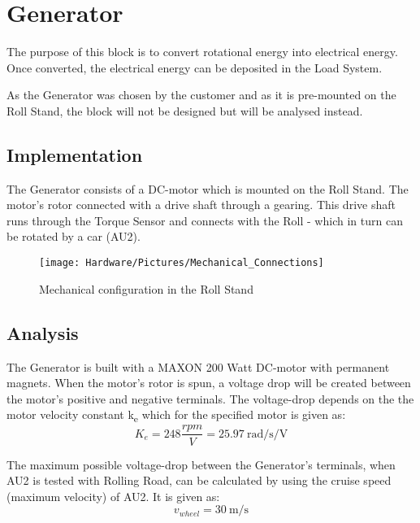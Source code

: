 \newpage
\section{Generator}
The purpose of this block is to convert rotational energy into electrical energy. Once converted, the electrical energy can be deposited in the Load System.

As the Generator was chosen by the customer and as it is pre-mounted on the Roll Stand, the block will not be designed but will be analysed instead.

\subsection{Implementation}
The Generator consists of a DC-motor which is mounted on the Roll Stand. The motor's rotor connected with a drive shaft through a gearing. This drive shaft runs through the Torque Sensor and connects with the Roll - which in turn can be rotated by a car (AU2).

\begin{figure}[H]
	\centering
	\texttt{[image: Hardware/Pictures/Mechanical\_Connections]}
	\caption{Mechanical configuration in the Roll Stand}
	\label{fig:Generator_Implementation}
\end{figure}

\subsection{Analysis}
\label{sec:GeneratorAnalysis}
The Generator is built with a MAXON 200 Watt DC-motor with permanent magnets\cite{Maxon}. When the motor's rotor is spun, a voltage drop will be created between the motor's positive and negative terminals. The voltage-drop depends on the the motor velocity constant k\textsubscript{e} which for the specified motor is given as:
\begin{equation}
	K_e = 248 \frac{rpm}{V} = \SI[per-mode=fraction]{25.97}{\radian \per \second \per \volt}
\end{equation}

The maximum possible voltage-drop between the Generator's terminals, when AU2 is tested with Rolling Road, can be calculated by using the cruise speed (maximum velocity) of AU2\cite{BAC_zenith33}. It is given as:
\begin{equation}
	v_{wheel} = \SI[per-mode=fraction]{30}{\meter \per \second}
\end{equation}


